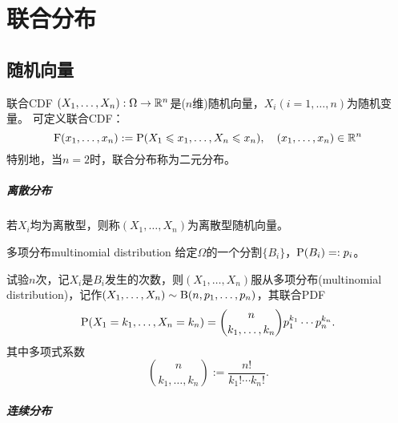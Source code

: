 \chapter{联合分布}

\section{随机向量}

\begin{definition}{联合CDF}{}
	$(X_1,\ldots,X_n):\Omega\to\RR^n$是($n$维)随机向量，$X_i(i=1,\ldots,n)$为随机变量。
	可定义联合CDF：
	\[
		\CDF(x_1,\ldots,x_n):=\P(X_1\leqslant x_1,\ldots,X_n\leqslant x_n),\quad(x_1,\ldots,x_n)\in\RR^n
	\]
	特别地，当$n=2$时，联合分布称为二元分布。
\end{definition}

\paragraph{离散分布}

若$X_i$均为离散型，则称$(X_1,\ldots,X_n)$为离散型随机向量。

\begin{example}{多项分布}{multinomial distribution}
	给定$\Omega$的一个分割$\{B_i\}$，$\P(B_i)=:p_i$。
	
	试验$n$次，记$X_i$是$B_i$发生的次数，则$(X_1,\ldots,X_n)$服从多项分布(multinomial distribution)，记作$(X_1,\ldots,X_n)\sim\Bern(n,p_1,\ldots,p_n)$，其联合PDF
	\[
		\P(X_1=k_1,\ldots,X_n=k_n)=\binom{n}{k_1,\ldots,k_n}p_1^{k_1}\cdots p_n^{k_n}.
	\]
	其中多项式系数
	\[
		\binom{n}{k_1,\ldots,k_n}:=\frac{n!}{k_1!\cdots k_n!}.
	\]
\end{example} 

\paragraph{连续分布}


